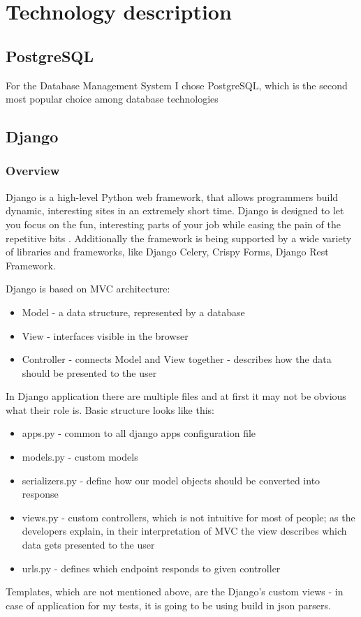 
\chapter{Technology description}


\section{PostgreSQL}

For the Database Management System I chose PostgreSQL, which is the second most popular choice among database technologies %

\section{Django}

\subsection{Overview}
Django is a high-level Python web framework, that allows programmers build dynamic, interesting sites in an extremely short time. Django is designed to let you focus on the fun, interesting parts of your job while easing the pain of the repetitive bits \cite{djangobook}. Additionally the framework is being supported by a wide variety of libraries and frameworks, like Django Celery, Crispy Forms, Django Rest Framework.

Django is based on MVC architecture:
\begin{itemize}
    \item Model - a data structure, represented by a database
    \item View - interfaces visible in the browser
    \item Controller - connects Model and View together - describes how the data should be presented to the user
\end{itemize}
In Django application there are multiple files and at first it may not be obvious what their role is. Basic structure looks like this:
\begin{itemize}
    \item apps.py - common to all django apps configuration file
    \item models.py - custom models
    \item serializers.py - define how our model objects should be converted into response
    \item views.py - custom controllers, which is not intuitive for most of people; as the developers explain, in their interpretation of MVC the view describes which data gets presented to the user \cite{djangoWhyViews}
    \item urls.py - defines which endpoint responds to given controller
\end{itemize}
Templates, which are not mentioned above, are the Django's custom views - in case of application for my tests, it is going to be using build in json parsers.

